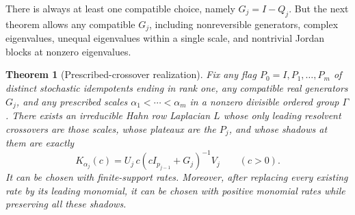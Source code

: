 \documentclass[11pt]{article}
\numberwithin{equation}{section}
\newtheorem{theorem}{Theorem}[section]
\theoremstyle{definition}
\theoremstyle{remark}
\begin{document}
There is always at least one compatible choice, namely $G_j=I-Q_j$. But the
next theorem allows any compatible $G_j$, including nonreversible generators,
complex eigenvalues, unequal eigenvalues within a single scale, and nontrivial
Jordan blocks at nonzero eigenvalues.

\begin{theorem}[Prescribed-crossover realization]\label{markov:thm:general-realization}
Fix any flag $P_0=I,P_1,\ldots,P_m$ of distinct stochastic idempotents ending
in rank one, any compatible real generators $G_j$, and any prescribed scales
$\alpha_1<\cdots<\alpha_m$ in a nonzero divisible ordered group $\Gamma$.
There exists an irreducible Hahn row Laplacian $L$ whose only leading resolvent
crossovers are those scales, whose plateaux are the $P_j$, and whose shadows at
them are exactly
\begin{equation}\label{markov:eq:prescribed-shadow}
 K_{\alpha_j}(c)=U_j\,c(cI_{p_{j-1}}+G_j)^{-1}V_j
 \qquad(c>0).
\end{equation}
It can be chosen with finite-support rates. Moreover, after replacing every
existing rate by its leading monomial, it can be chosen with positive monomial
rates while preserving all these shadows.
\end{theorem}
\end{document}
